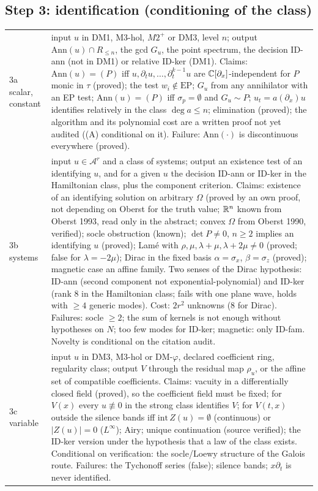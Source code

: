 \subsection*{Step 3: identification (conditioning of the class)}
\begin{tabular}{@{}p{2.2cm}p{9.6cm}@{}}
\toprule
3a scalar, constant & input $u$ in DM1, M3-hol, $M2^+$ or DM3, level $n$; output $\mathrm{Ann}(u)\cap R_{\le n}$, the gcd $G_u$, the point spectrum, the decision ID-ann (not in DM1) or relative ID-ker (DM1). Claims: $\mathrm{Ann}(u)=(P)$ iff $u,\partial_tu,\dots,\partial_t^{k-1}u$ are $\mathbb{C}[\partial_x]$-independent for $P$ monic in $\tau$ (proved); the test $w_i\notin\mathrm{EP}$; $G_u$ from any annihilator with an EP test; $\mathrm{Ann}(u)=(P)$ iff $\sigma_p=\emptyset$ and $G_u\sim P$; $u_t=a(\partial_x)u$ identifies relatively in the class $\deg a\le n$; elimination (proved); the algorithm and its polynomial cost are a written proof not yet audited ((A) conditional on it). Failure: $\mathrm{Ann}(\cdot)$ is discontinuous everywhere (proved).\\
3b systems & input $u\in\mathcal A^r$ and a class of systems; output an existence test of an identifying $u$, and for a given $u$ the decision ID-ann or ID-ker in the Hamiltonian class, plus the component criterion. Claims: existence of an identifying solution on arbitrary $\Omega$ (proved by an own proof, not depending on Oberst for the truth value; $\mathbb{R}^n$ known from Oberst 1993, read only in the abstract; convex $\Omega$ from Oberst 1990, verified); socle obstruction (known); $\det P\ne0$, $n\ge2$ implies an identifying $u$ (proved); Lam\'e with $\rho,\mu,\lambda+\mu,\lambda+2\mu\ne0$ (proved; false for $\lambda=-2\mu$); Dirac in the fixed basis $\alpha=\sigma_x$, $\beta=\sigma_z$ (proved); magnetic case an affine family. Two senses of the Dirac hypothesis: ID-ann (second component not exponential-polynomial) and ID-ker (rank 8 in the Hamiltonian class; fails with one plane wave, holds with $\ge4$ generic modes). Cost: $2r^2$ unknowns (8 for Dirac). Failures: socle $\ge2$; the sum of kernels is not enough without hypotheses on $N$; too few modes for ID-ker; magnetic: only ID-fam. Novelty is conditional on the citation audit.\\
3c variable & input $u$ in DM3, M3-hol or DM-$\varphi$, declared coefficient ring, regularity class; output $V$ through the residual map $\rho_u$, or the affine set of compatible coefficients. Claims: vacuity in a differentially closed field (proved), so the coefficient field must be fixed; for $V(x)$ every $u\not\equiv0$ in the strong class identifies $V$; for $V(t,x)$ outside the silence bands iff $\mathrm{int}\,Z(u)=\emptyset$ (continuous) or $\lvert Z(u)\rvert=0$ ($L^\infty$); Airy; unique continuation (source verified); the ID-ker version under the hypothesis that a law of the class exists. Conditional on verification: the socle/Loewy structure of the Galois route. Failures: the Tychonoff series (false); silence bands; $x\partial_t$ is never identified.\\
\bottomrule
\end{tabular}

